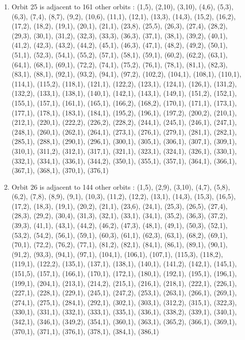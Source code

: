 \documentclass[12pt]{article}
\begin{document}
\begin{enumerate}
\item Orbit 25 is adjacent to 161 other orbits : (1,5), (2,10), (3,10), (4,6), (5,3), (6,3), (7,4), (8,7), (9,2), (10,6), (11,1), (12,1), (13,3), (14,3), (15,2), (16,2), (17,2), (18,2), (19,1), (20,1), (21,1), (23,8), (25,5), (26,3), (27,4), (28,2), (29,3), (30,1), (31,2), (32,3), (33,3), (36,3), (37,1), (38,1), (39,2), (40,1), (41,2), (42,3), (43,2), (44,2), (45,1), (46,3), (47,1), (48,2), (49,2), (50,1), (51,1), (52,3), (54,1), (55,2), (57,1), (58,1), (59,1), (60,2), (62,2), (63,1), (64,1), (68,1), (69,1), (72,2), (74,1), (75,2), (76,1), (78,1), (81,1), (82,3), (83,1), (88,1), (92,1), (93,2), (94,1), (97,2), (102,2), (104,1), (108,1), (110,1), (114,1), (115,2), (118,1), (121,1), (122,2), (123,1), (124,1), (126,1), (131,2), (132,2), (133,1), (138,1), (140,1), (142,1), (143,1), (149,1), (151,2), (152,1), (155,1), (157,1), (161,1), (165,1), (166,2), (168,2), (170,1), (171,1), (173,1), (177,1), (178,1), (183,1), (184,1), (195,2), (196,1), (197,2), (200,2), (210,1), (212,1), (220,1), (222,2), (226,2), (228,2), (244,1), (245,1), (246,1), (247,1), (248,1), (260,1), (262,1), (264,1), (273,1), (276,1), (279,1), (281,1), (282,1), (285,1), (288,1), (290,1), (296,1), (300,1), (305,1), (306,1), (307,1), (309,1), (310,1), (311,2), (312,1), (317,1), (321,1), (323,1), (324,1), (326,1), (330,1), (332,1), (334,1), (336,1), (344,2), (350,1), (355,1), (357,1), (364,1), (366,1), (367,1), (368,1), (370,1), (376,1)
\item Orbit 26 is adjacent to 144 other orbits : (1,5), (2,9), (3,10), (4,7), (5,8), (6,2), (7,8), (8,9), (9,1), (10,3), (11,2), (12,2), (13,1), (14,3), (15,3), (16,5), (17,2), (18,3), (19,1), (20,2), (21,1), (23,6), (24,1), (25,3), (26,5), (27,4), (28,3), (29,2), (30,4), (31,3), (32,1), (33,1), (34,1), (35,2), (36,3), (37,2), (39,3), (41,1), (43,1), (44,2), (46,2), (47,3), (48,1), (49,1), (50,3), (52,1), (53,2), (54,2), (56,1), (59,1), (60,3), (61,1), (62,3), (63,1), (68,2), (69,1), (70,1), (72,2), (76,2), (77,1), (81,2), (82,1), (84,1), (86,1), (89,1), (90,1), (91,2), (93,3), (94,1), (97,1), (104,1), (106,1), (107,1), (115,3), (118,2), (119,1), (122,2), (135,1), (137,1), (138,1), (140,1), (141,2), (142,1), (145,1), (151,5), (157,1), (166,1), (170,1), (172,1), (180,1), (192,1), (195,1), (196,1), (199,1), (204,1), (213,1), (214,2), (215,1), (216,1), (218,1), (222,1), (226,1), (227,1), (228,1), (229,1), (245,1), (247,2), (253,1), (263,1), (266,1), (269,1), (274,1), (275,1), (284,1), (292,1), (302,1), (303,1), (312,2), (315,1), (322,3), (330,1), (331,1), (332,1), (333,1), (335,1), (336,1), (338,2), (339,1), (340,1), (342,1), (346,1), (349,2), (354,1), (360,1), (363,1), (365,2), (366,1), (369,1), (370,1), (371,1), (376,1), (378,1), (384,1), (386,1)

\end{enumerate}
\end{document}
